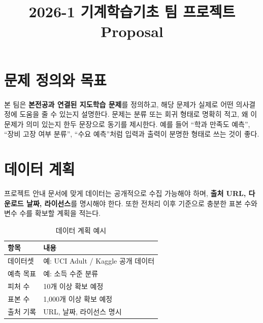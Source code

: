 \documentclass[10pt,a4paper,twocolumn]{article}
\title{2026-1 기계학습기초 팀 프로젝트 Proposal}
\author{}
\date{}
\begin{document}

\section{문제 정의와 목표}
본 팀은 \textbf{본전공과 연결된 지도학습 문제}를 정의하고, 해당 문제가 실제로 어떤 의사결정에 도움을 줄 수 있는지 설명한다. 문제는 분류 또는 회귀 형태로 명확히 적고, 왜 이 문제가 의미 있는지 한두 문장으로 동기를 제시한다. 예를 들어 ``학과 만족도 예측'', ``장비 고장 여부 분류'', ``수요 예측''처럼 입력과 출력이 분명한 형태로 쓰는 것이 좋다.

\section{데이터 계획}
프로젝트 안내 문서에 맞게 데이터는 공개적으로 수집 가능해야 하며, \textbf{출처 URL, 다운로드 날짜, 라이선스}를 명시해야 한다. 또한 전처리 이후 기준으로 충분한 표본 수와 변수 수를 확보할 계획을 적는다.

\begin{table}[h]
\vspace{-6pt}
\centering
\footnotesize
\setlength{\tabcolsep}{3pt}
\caption{\small 데이터 계획 예시}
\begin{tabularx}{\columnwidth}{@{}p{14mm}X@{}}
\toprule
항목 & 내용 \\
\midrule
데이터셋 & 예: UCI Adult / Kaggle 공개 데이터 \\
예측 목표 & 예: 소득 수준 분류 \\
피처 수 & 10개 이상 확보 예정 \\
표본 수 & 1{,}000개 이상 확보 예정 \\
출처 기록 & URL, 날짜, 라이선스 명시 \\
\bottomrule
\end{tabularx}
\vspace{-6pt}
\end{table}
\end{document}
